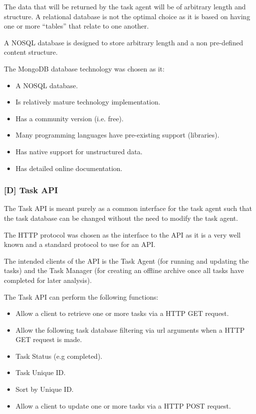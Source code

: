 \documentclass{mscreport}
\begin{document}
\vspace{0.3cm} \noindent
The data that will be returned by the task agent will be of arbitrary length and structure. A relational database is not the optimal choice as it is based on having one or more ``tables'' that relate to one another.

\vspace{0.3cm} \noindent
A NOSQL database is designed to store arbitrary length and a non pre-defined content structure.

\vspace{0.3cm} \noindent
The MongoDB database technology was chosen as it:

\begin{itemize}
	\setlength\itemsep{0.1em}
    \item A NOSQL database.
    \item Is relatively mature technology implementation.
    \item Has a community version (i.e. free).
    \item Many programming languages have pre-existing support (libraries).
    \item Has native support for unstructured data.
    \item Has detailed online documentation.
\end{itemize}

\subsubsection{[D] Task API}

The Task API is meant purely as a common interface for the task agent such that the task database can be changed without the need to modify the task agent.

\vspace{0.3cm} \noindent
The HTTP protocol was chosen as the interface to the API as it is a very well known and a standard protocol to use for an API.

\vspace{0.3cm} \noindent
The intended clients of the API is the Task Agent (for running and updating the tasks) and the Task Manager (for creating an offline archive once all tasks have completed for later analysis).

\vspace{0.3cm} \noindent
The Task API can perform the following functions:

\begin{itemize}
	\setlength\itemsep{0.1em}
    \item Allow a client to retrieve one or more tasks via a HTTP GET request.
    \item Allow the following task database filtering via url arguments when a HTTP GET request is made.
    \item Task Status (e.g completed).
    \item Task Unique ID.
    \item Sort by Unique ID.
    \item Allow a client to update one or more tasks via a HTTP POST request.
\end{itemize}
\end{document}
